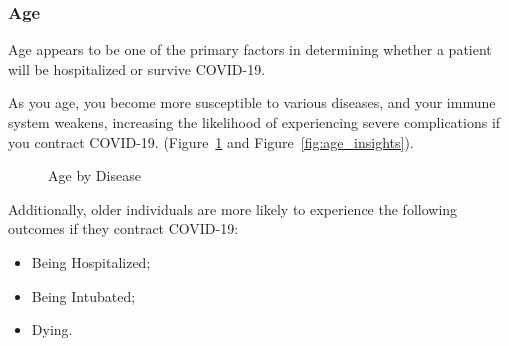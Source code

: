\subsubsection{Age}

Age appears to be one of the primary factors in determining whether a patient will be hospitalized 
or survive COVID-19.

As you age, you become more susceptible to various diseases, and your immune system weakens, 
increasing the likelihood of experiencing severe complications if you contract COVID-19. 
(Figure~\ref{fig:age_insights_resume} and Figure~\ref{fig:age_insights}).

\begin{figure}[H]%
    \caption{Age by Disease}%
    \label{fig:age_insights_resume}%
    \centering
    \qquad
\end{figure}

Additionally, older individuals are more likely to experience the following 
outcomes if they contract COVID-19:
\begin{itemize}
    \item Being Hospitalized;
    \item Being Intubated;
    \item Dying.
\end{itemize}

